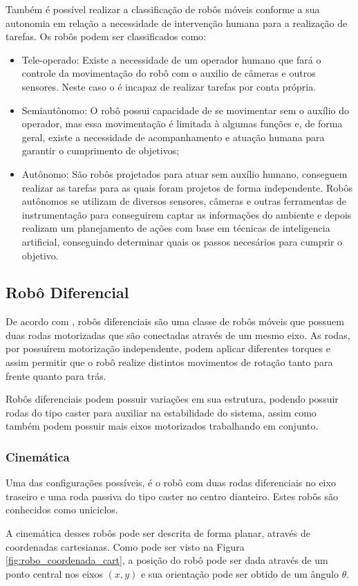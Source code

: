 Também é possível realizar a classificação de robôs móveis conforme a sua autonomia em relação a necessidade de intervenção humana para a realização de tarefas. Os robôs podem ser classificados como:
\begin{itemize}
    \item Tele-operado: Existe a necessidade de um operador humano que fará o controle da movimentação do robô com o auxilio de câmeras e outros sensores. Neste caso o é incapaz de realizar tarefas por conta própria.
    \item Semiautônomo: O robô possui capacidade de se movimentar sem o auxílio do operador, mas essa movimentação é limitada à algumas funções e, de forma geral, existe a necessidade de acompanhamento e atuação humana para garantir o cumprimento de objetivos;
    \item Autônomo: São robôs projetados para atuar sem auxílio humano, conseguem realizar as tarefas para as quais foram projetos de forma independente. Robôs autônomos se utilizam de diversos sensores, câmeras e outras ferramentas de instrumentação para conseguirem captar as informações do ambiente e depois realizam um planejamento de ações com base em técnicas de inteligencia artificial, conseguindo determinar quais os passos necesários para cumprir o objetivo. 
\end{itemize}

\subsection{Robô Diferencial}
De acordo com , robôs diferenciais são uma classe de robôs móveis que possuem duas rodas motorizadas que são conectadas através de um mesmo eixo. As rodas, por possuírem motorização independente, podem aplicar diferentes torques e assim permitir que o robô realize distintos movimentos de rotação tanto para frente quanto para trás. 
\par
Robôs diferenciais podem possuir variações em sua estrutura, podendo possuir rodas do tipo caster para auxiliar na estabilidade do sistema, assim como também podem possuir mais eixos motorizados trabalhando em conjunto. \cite{guarino1995}
\par

\subsubsection{Cinemática}
Uma das configurações possíveis, é o robô com duas rodas diferenciais no eixo traseiro e uma roda passiva do tipo caster no centro dianteiro. Estes robôs são conhecidos como uniciclos. \cite{aicardi1995closed}
\par
A cinemática desses robôs pode ser descrita de forma planar, através de coordenadas cartesianas. Como pode ser visto na Figura \ref{fig:robo_coordenada_cart}, a posição do robô pode ser dada através de um ponto central nos eixos $(x,y)$ e sua orientação pode ser obtido de um ângulo $\theta$. \cite{sousa2003controle}
\par

